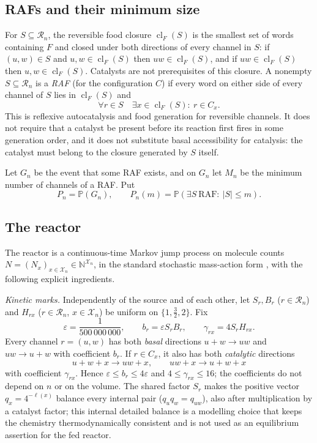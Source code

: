 \documentclass[11pt,letterpaper]{article}
\theoremstyle{plain}
\theoremstyle{definition}
\theoremstyle{remark}
\numberwithin{equation}{section}
\newcommand{\PP}{\mathbb P}
\newcommand{\N}{\mathbb N}
\newcommand{\XX}{\mathcal X}
\newcommand{\RR}{\mathcal R}
\newcommand{\eps}{\varepsilon}
\newcommand{\cl}{\operatorname{cl}}
\begin{document}
\subsection{RAFs and their minimum size}
For $S\subseteq\RR_n$, the reversible food closure $\cl_F(S)$ is the smallest set of words containing $F$ and closed under both directions of every channel in $S$: if $(u,w)\in S$ and $u,w\in\cl_F(S)$ then $uw\in\cl_F(S)$, and if $uw\in\cl_F(S)$ then $u,w\in\cl_F(S)$. Catalysts are not prerequisites of this closure. A nonempty $S\subseteq\RR_n$ is a \emph{RAF} (for the configuration $C$) if every word on either side of every channel of $S$ lies in $\cl_F(S)$ and
\begin{equation}\label{eq:raf}
 \forall r\in S\quad\exists x\in\cl_F(S):\ r\in C_x .
\end{equation}
This is reflexive autocatalysis and food generation for reversible channels. It does not require that a catalyst be present before its reaction first fires in some generation order, and it does not substitute basal accessibility for catalysis: the catalyst must belong to the closure generated by $S$ itself.

Let $G_n$ be the event that some RAF exists, and on $G_n$ let $M_n$ be the minimum number of channels of a RAF. Put
\begin{equation}\label{eq:Pn}
 P_n=\PP(G_n),\qquad P_n(m)=\PP(\exists S\ \text{RAF}:\ |S|\le m).
\end{equation}

\subsection{The reactor}\label{sec:reactor}
The reactor is a continuous-time Markov jump process on molecule counts $N=(N_x)_{x\in\XX_n}\in\N^{\XX_n}$, in the standard stochastic mass-action form \cite{kurtz1972relationship,anderson2011continuous}, with the following explicit ingredients.

\emph{Kinetic marks.} Independently of the source and of each other, let $S_r,B_r$ ($r\in\RR_n$) and $H_{rx}$ ($r\in\RR_n$, $x\in\XX_n$) be uniform on $\{1,\tfrac32,2\}$. Fix
\begin{equation}\label{eq:parameters}
 \eps=\frac1{500\,000\,000},\qquad b_r=\eps S_rB_r,\qquad \gamma_{rx}=4S_rH_{rx} .
\end{equation}
Every channel $r=(u,w)$ has both \emph{basal} directions $u+w\to uw$ and $uw\to u+w$ with coefficient $b_r$. If $r\in C_x$, it also has both \emph{catalytic} directions
\[
 u+w+x\to uw+x,\qquad uw+x\to u+w+x
\]
with coefficient $\gamma_{rx}$. Hence $\eps\le b_r\le4\eps$ and $4\le\gamma_{rx}\le16$; the coefficients do not depend on $n$ or on the volume. The shared factor $S_r$ makes the positive vector $q_x=4^{-\ell(x)}$ balance every internal pair ($q_uq_w=q_{uw}$), also after multiplication by a catalyst factor; this internal detailed balance is a modelling choice that keeps the chemistry thermodynamically consistent and is not used as an equilibrium assertion for the fed reactor.
\end{document}
